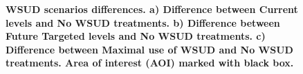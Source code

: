 \documentclass[final,3p,times,authoryear]{elsarticle}
\begin{document}
\begin{figure}[!htbp]
\centering   

\caption{\bf WSUD scenarios differences. a) Difference between Current levels and No WSUD treatments. b) Difference between Future Targeted levels and No WSUD treatments. c) Difference between Maximal use of WSUD and No WSUD treatments. Area of interest (AOI) marked with black box.}    
 \label{fig:sunburyDiffScenarios} 
\end{figure} 
\end{document}
